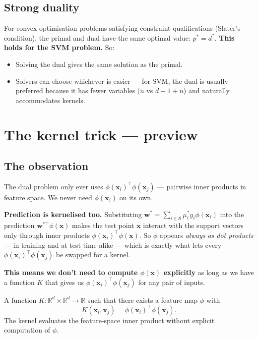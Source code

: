\documentclass[11pt, a4paper]{article}
\begin{document}
\subsection{Strong duality}

For convex optimisation problems satisfying constraint qualifications (Slater's condition), the primal and dual have the same optimal value: $p^* = d^*$. \textbf{This holds for the SVM problem.} So:
\begin{itemize}
  \item Solving the dual gives the same solution as the primal.
  \item Solvers can choose whichever is easier — for SVM, the dual is usually preferred because it has fewer variables ($n$ vs $d + 1 + n$) and naturally accommodates kernels.
\end{itemize}

\section{The kernel trick --- preview}

\subsection{The observation}

The dual problem only ever uses $\phi(\mathbf{x}_i)^\top\phi(\mathbf{x}_j)$ — pairwise inner products in feature space. We never need $\phi(\mathbf{x}_i)$ on its own.

\textbf{Prediction is kernelised too.} Substituting $\mathbf{w}^* = \sum_{i\in\mathcal{S}}\mu_i^* y_i\phi(\mathbf{x}_i)$ into the prediction $\mathbf{w}^{*\top}\phi(\mathbf{x})$ makes the test point $\mathbf{x}$ interact with the support vectors only through inner products $\phi(\mathbf{x}_i)^\top\phi(\mathbf{x})$. So $\phi$ appears \emph{always as dot products} — in training and at test time alike — which is exactly what lets every $\phi(\mathbf{x}_i)^\top\phi(\mathbf{x}_j)$ be swapped for a kernel.

\textbf{This means we don't need to compute $\phi(\mathbf{x})$ explicitly} as long as we have a function $K$ that gives us $\phi(\mathbf{x}_i)^\top\phi(\mathbf{x}_j)$ for any pair of inputs.

\begin{defbox}
A function $K : \mathbb{R}^d \times \mathbb{R}^d \to \mathbb{R}$ such that there exists a feature map $\phi$ with
\[
K(\mathbf{x}_i, \mathbf{x}_j) = \phi(\mathbf{x}_i)^\top\phi(\mathbf{x}_j).
\]
The kernel evaluates the feature-space inner product without explicit computation of $\phi$.
\end{defbox}
\end{document}
